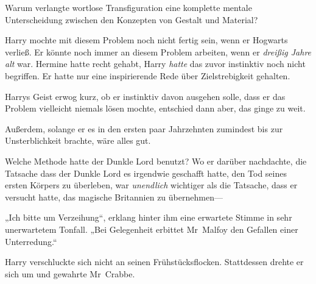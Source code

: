 Warum verlangte wortlose Transfiguration eine komplette mentale Unterscheidung zwischen den Konzepten von Gestalt und Material?

Harry mochte mit diesem Problem noch nicht fertig sein, wenn er Hogwarts verließ. Er könnte noch immer an diesem Problem arbeiten, wenn er \emph{dreißig Jahre alt} war. Hermine hatte recht gehabt, Harry \emph{hatte} das zuvor instinktiv noch nicht begriffen. Er hatte nur eine inspirierende Rede über Zielstrebigkeit gehalten.

Harrys Geist erwog kurz, ob er instinktiv davon ausgehen solle, dass er das Problem vielleicht niemals lösen mochte, entschied dann aber, das ginge zu weit.

Außerdem, solange er es in den ersten paar Jahrzehnten zumindest bis zur Unsterblichkeit brachte, wäre alles gut.

Welche Methode hatte der Dunkle Lord benutzt? Wo er darüber nachdachte, die Tatsache dass der Dunkle Lord es irgendwie geschafft hatte, den Tod seines ersten Körpers zu überleben, war \emph{unendlich} wichtiger als die Tatsache, dass er versucht hatte, das magische Britannien zu übernehmen—

„Ich bitte um Verzeihung“, erklang hinter ihm eine erwartete Stimme in sehr unerwartetem Tonfall. „Bei Gelegenheit erbittet Mr~Malfoy den Gefallen einer Unterredung.“

Harry verschluckte sich nicht an seinen Frühstücksflocken. Stattdessen drehte er sich um und gewahrte Mr~Crabbe.

